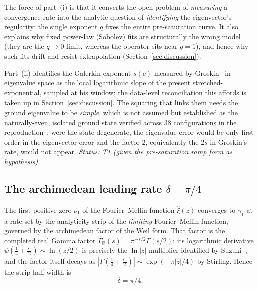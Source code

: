 \documentclass[11pt,a4paper]{article}
\begin{document}
The force of part~(i) is that it converts the open problem of \emph{measuring}
a convergence rate into the analytic question of \emph{identifying} the
eigenvector's regularity: the single exponent $q$ fixes the entire pre-saturation
curve. It also explains why fixed power-law (Sobolev) fits are structurally the
wrong model (they are the $q\to0$ limit, whereas the operator sits near $q=1$),
and hence why such fits drift and resist extrapolation
(Section~\ref{sec:discussion}).

Part~(ii) identifies the Galerkin exponent $s(c)$ measured by
Groskin~\cite{Groskin2026} in eigenvalue space as the local logarithmic slope
of the present stretched-exponential, sampled at his window; the data-level
reconciliation this affords is taken up in Section~\ref{sec:discussion}. The squaring
that links them needs the ground eigenvalue to be \emph{simple}, which is not
assumed but established as the naturally-even, isolated ground state verified
across $38$ configurations in the reproduction~\cite{AndrewsA}; were the state
degenerate, the eigenvalue error would be only first order in the eigenvector
error and the factor $2$, equivalently the $2s$ in Groskin's rate, would not
appear. \emph{Status: T1 (given the pre-saturation ramp form as hypothesis).}

\subsection{The archimedean leading rate $\delta=\pi/4$}\label{ssec:arch}

The first positive zero $\nu_1$ of the Fourier--Mellin function $\widehat\xi(z)$
converges to $\gamma_1$ at a rate set by the analyticity strip of the
\emph{limiting} Fourier--Mellin function, governed by the archimedean factor of
the Weil form. That factor
is the completed real Gamma factor $\Gamma_\mathbb{R}(s)=\pi^{-s/2}\Gamma(s/2)$:
its
logarithmic derivative $\psi(\tfrac14+\tfrac{iz}{2})\sim\ln(z/2)$ is precisely
the $\ln|z|$ multiplier identified by Suzuki~\cite{Suzuki2026}, and the factor
itself decays as $|\Gamma(\tfrac14+\tfrac{iz}{2})|\sim\exp(-\pi|z|/4)$ by
Stirling. Hence the strip half-width is
\begin{equation}\label{eq:delta}
  \delta=\pi/4 .
\end{equation}
\end{document}
